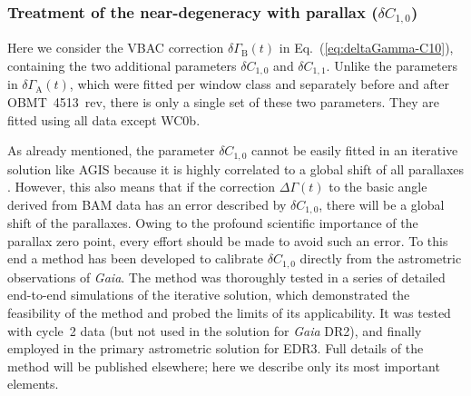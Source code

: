 \documentclass[longauth]{aa} %
\begin{document}
\subsubsection{Treatment of the near-degeneracy with parallax ($\delta C_{1,0}$)}
\label{sec:C10}

Here we consider the VBAC correction $\delta\Gamma_\text{B}(t)$ in 
Eq.~(\ref{eq:deltaGamma-C10}), containing the two additional parameters
$\delta C_{1,0}$ and $\delta C_{1,1}$. Unlike the parameters in $\delta\Gamma_\text{A}(t)$,
which were fitted per window class and separately before and after OBMT~4513~rev, 
there is only a single set of these two parameters. They are fitted using all data except WC0b.

As already mentioned, the parameter $\delta C_{1,0}$ cannot be easily fitted in an
iterative solution like AGIS because it is highly correlated to a global shift of all parallaxes
. However, this also means that if the correction $\Delta\Gamma(t)$ 
to the basic angle derived from BAM data has an error described by $\delta C_{1,0}$, there will be
a global shift of the parallaxes. Owing to the profound scientific importance of the parallax
zero point, every effort should be made to avoid such an error. To this end a
method has been developed to calibrate $\delta C_{1,0}$ directly from the astrometric 
observations of \textit{Gaia}. The method was thoroughly tested in a series of detailed
end-to-end simulations of the iterative solution, which demonstrated the feasibility of the 
method and probed the limits of its applicability. It was tested with cycle~2 data (but 
not used in the solution for \textit{Gaia} DR2), and finally employed in the primary astrometric 
solution for EDR3. Full details of the method will be published elsewhere; here we describe 
only its most important elements.
\end{document}
